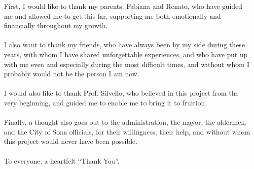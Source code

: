 First, I would like to thank my parents, Fabiana and Renato, who have guided me and allowed me to get this far, supporting me both emotionally and financially throughout my growth.

\paragraph*{}
I also want to thank my friends, who have always been by my side during these years, with whom I have shared unforgettable experiences, and who have put up with me even and especially during the most difficult times, and without whom I probably would not be the person I am now.

\paragraph*{}
I would also like to thank Prof. Silvello, who believed in this project from the very beginning, and guided me to enable me to bring it to fruition.

\paragraph*{}
Finally, a thought also goes out to the administration, the mayor, the aldermen, and the City of Sona officials, for their willingness, their help, and without whom this project would never have been possible.

\paragraph*{}
To everyone, a heartfelt “Thank You”.
